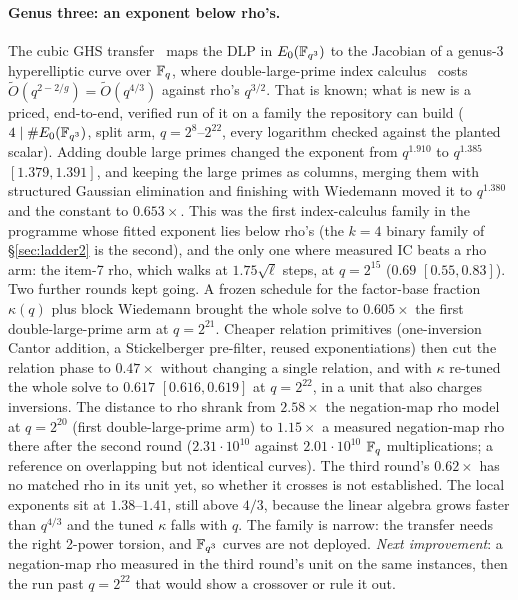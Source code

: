 \paragraph{Genus three: an exponent below rho's.} The cubic GHS
transfer~\cite{ghs2002} maps the DLP in $E_0(\mathbb{F}_{q^3})$ to the Jacobian
of a genus-3 hyperelliptic curve over $\mathbb{F}_q$, where double-large-prime
index calculus~\cite{gtthd2007} costs $\tilde O(q^{2-2/g})=\tilde O(q^{4/3})$
against rho's $q^{3/2}$. That is known; what is new is a priced,
end-to-end, verified run of it on a family the repository can build
($4\mid\#E_0(\mathbb{F}_{q^3})$, split arm, $q=2^{8}$--$2^{22}$, every logarithm checked
against the planted scalar). Adding double large primes changed the
exponent from $q^{1.910}$ to $q^{1.385}$ $[1.379,1.391]$, and keeping the large
primes as columns, merging them with structured Gaussian elimination and
finishing with Wiedemann moved it to $q^{1.380}$ and the constant to
$0.653\times$. This was the first index-calculus family in the programme whose fitted
exponent lies below rho's (the $k=4$ binary family of \S\ref{sec:ladder2}
is the second), and the only one where measured IC beats a rho arm: the item-7 rho, which walks at $1.75\sqrt\ell$ steps,
at $q=2^{15}$ ($0.69$ $[0.55,0.83]$). Two further
rounds kept going. A frozen schedule for the factor-base fraction $\kappa(q)$
plus block Wiedemann brought the whole solve to $0.605\times$ the first
double-large-prime arm at $q=2^{21}$. Cheaper relation primitives
(one-inversion Cantor addition, a Stickelberger pre-filter, reused
exponentiations) then cut the relation phase to $0.47\times$ without
changing a single relation, and with $\kappa$ re-tuned the whole solve to
$0.617$ $[0.616,0.619]$ at $q=2^{22}$, in a unit that also charges
inversions. The distance to rho shrank from $2.58\times$ the negation-map
rho model at $q=2^{20}$ (first double-large-prime arm) to $1.15\times$ a
measured negation-map rho there after the second round ($2.31\cdot10^{10}$
against $2.01\cdot10^{10}$ $\mathbb{F}_q$ multiplications; a reference on
overlapping but not identical curves). The third round's $0.62\times$
has no matched rho in its unit yet, so whether it crosses is not
established. The local exponents sit at $1.38$--$1.41$, still above $4/3$,
because the linear algebra grows faster than $q^{4/3}$ and the tuned
$\kappa$ falls with $q$. The family is narrow: the transfer needs the
right 2-power torsion, and $\mathbb{F}_{q^3}$ curves are not deployed.
\emph{Next improvement}: a negation-map rho measured in the third round's
unit on the same instances, then the run past $q=2^{22}$ that would show a
crossover or rule it out.

